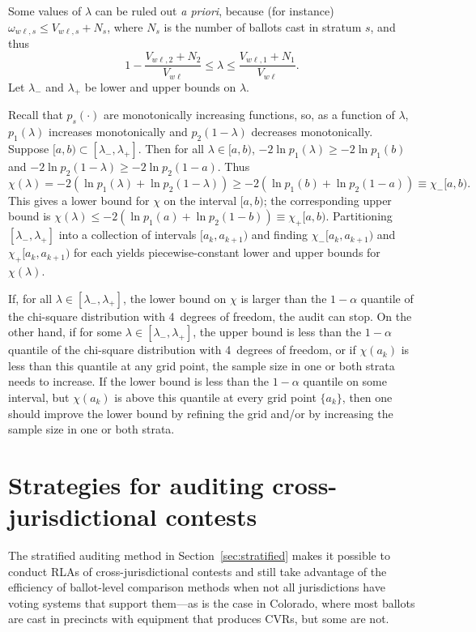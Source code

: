 \documentclass[runningheads]{llncs}
\newcommand{\beq}{\begin{equation}}
\newcommand{\eeq}{\end{equation}}
\begin{document}
Some values of $\lambda$ can be ruled out \emph{a priori}, because (for instance) $\omega_{w\ell,s} \le V_{w\ell,s}+N_s$, where $N_s$ is the number of ballots cast in stratum $s$, and thus
\beq
   1 - \frac{V_{w\ell,2}+N_2}{V_{w\ell}} \le \lambda \le \frac{V_{w\ell,1}+N_1}{V_{w\ell}}.
\eeq
Let $\lambda_-$ and $\lambda_+$ be lower and upper bounds on $\lambda$.

Recall that $p_s(\cdot)$ are monotonically increasing functions, so, as a function of $\lambda$, $p_1(\lambda)$ increases monotonically and $p_2(1-\lambda)$ decreases monotonically.
Suppose $[a, b) \subset [\lambda_-, \lambda_+]$.
Then for all $\lambda \in [a, b)$, $-2\ln p_1(\lambda) \ge -2\ln p_1(b)$ and
$-2\ln p_2(1-\lambda) \ge -2\ln p_2(1-a)$.
Thus
\beq\label{eq:lowerbound}
   \chi(\lambda) = -2(\ln p_1(\lambda)+ \ln p_2(1-\lambda))
          \ge -2(\ln p_1(b) + \ln p_2(1-a)) \equiv \chi_-[a,b).
\eeq
This gives a lower bound for $\chi$ on the interval $[a, b)$; the corresponding 
upper bound is $\chi(\lambda) \le -2(\ln p_1(a) + \ln p_2(1-b)) \equiv \chi_+[a,b)$.
Partitioning $[\lambda_-, \lambda_+]$ into a collection of intervals $[a_k, a_{k+1})$
and finding $\chi_-[a_k, a_{k+1})$ and $\chi_+[a_k, a_{k+1})$ for each
yields piecewise-constant lower and upper bounds for $\chi(\lambda)$.

If, for all $\lambda \in [\lambda_-, \lambda_+]$, the lower bound on $\chi$
is larger than the $1-\alpha$ quantile of the chi-square distribution with 4~degrees of freedom,
the audit can stop.
On the other hand, if for some $\lambda \in [\lambda_-, \lambda_+]$, 
the upper bound is less than the $1-\alpha$ quantile of the chi-square distribution with 4~degrees of freedom, 
or if $\chi(a_k)$ is less than this quantile at any grid point,
the sample size in one or both strata needs to increase.
If the lower bound is less than the $1-\alpha$ quantile on some interval,
but $\chi(a_k)$ is above this quantile at every grid point $\{a_k\}$, then one should improve the lower bound by refining the grid and/or by increasing the sample size in one or both strata.

\section{Strategies for auditing cross-jurisdictional contests}\label{sec:combiningMethods}

The stratified auditing method in Section~\ref{sec:stratified} makes it possible to conduct RLAs of cross-jurisdictional contests and still take advantage of the efficiency of ballot-level comparison methods when not all jurisdictions have voting systems that support them---as is the case in Colorado, where most ballots are cast in precincts with equipment that produces CVRs, but some are not.
\end{document}
